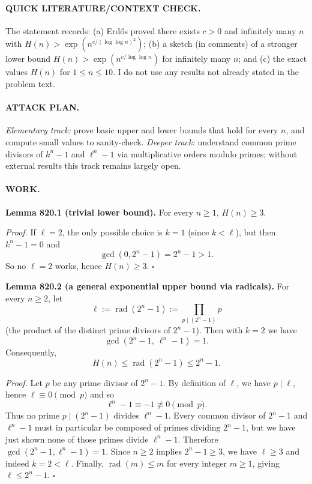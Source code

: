 \paragraph{QUICK LITERATURE/CONTEXT CHECK.}
The statement records: (a) Erd\H{o}s proved there exists $c>0$ and infinitely many $n$ with $H(n) > \exp(n^{c/(\log\log n)^2})$; (b) a sketch (in comments) of a stronger lower bound $H(n) > \exp(n^{c/\log\log n})$ for infinitely many $n$; and (c) the exact values $H(n)$ for $1\le n\le 10$.
I do not use any results not already stated in the problem text.

\paragraph{ATTACK PLAN.}
\emph{Elementary track:} prove basic upper and lower bounds that hold for every $n$, and compute small values to sanity-check.
\emph{Deeper track:} understand common prime divisors of $k^n-1$ and $\ell^n-1$ via multiplicative orders modulo primes; without external results this track remains largely open.

\paragraph{WORK.}
\textbf{Lemma 820.1 (trivial lower bound).}
For every $n\ge1$, $H(n)\ge 3$.

\emph{Proof.}
If $\ell=2$, the only possible choice is $k=1$ (since $k<\ell$), but then $k^n-1=0$ and
\[
\gcd(0,2^n-1)=2^n-1>1.
\]
So no $\ell=2$ works, hence $H(n)\ge3$.
\hfill $\square$

\textbf{Lemma 820.2 (a general exponential upper bound via radicals).}
For every $n\ge2$, let
\[
\ell := \operatorname{rad}(2^n-1) := \prod_{p\mid (2^n-1)} p
\]
(the product of the distinct prime divisors of $2^n-1$). Then with $k=2$ we have
\[
\gcd(2^n-1,\ \ell^n-1)=1.
\]
Consequently,
\[
H(n) \le \operatorname{rad}(2^n-1) \le 2^n-1.
\]

\emph{Proof.}
Let $p$ be any prime divisor of $2^n-1$. By definition of $\ell$, we have $p\mid\ell$, hence $\ell\equiv 0\pmod p$ and so
\[
\ell^n-1 \equiv -1 \not\equiv 0 \pmod p.
\]
Thus no prime $p\mid (2^n-1)$ divides $\ell^n-1$.
Every common divisor of $2^n-1$ and $\ell^n-1$ must in particular be composed of primes dividing $2^n-1$, but we have just shown none of those primes divide $\ell^n-1$.
Therefore $\gcd(2^n-1,\ell^n-1)=1$.
Since $n\ge2$ implies $2^n-1\ge3$, we have $\ell\ge3$ and indeed $k=2<\ell$.
Finally, $\operatorname{rad}(m)\le m$ for every integer $m\ge1$, giving $\ell\le 2^n-1$.
\hfill $\square$

